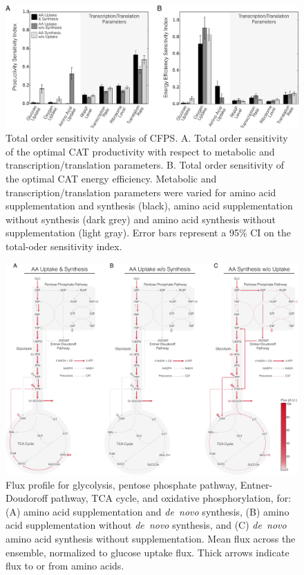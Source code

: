 \documentclass[journal=asbcd6,manuscript=article]{achemso}
\begin{document}
\clearpage

\begin{figure}[t!]
\includegraphics[width=1.00\textwidth]{./figs/Fig-3-Sensitivity-Analysis.pdf}
\caption{Total order sensitivity analysis of CFPS.
A. Total order sensitivity of the optimal CAT productivity with respect to metabolic and transcription/translation parameters.
B. Total order sensitivity of the optimal CAT energy efficiency.
Metabolic and transcription/translation parameters were varied for amino acid supplementation and synthesis (black),
amino acid supplementation without synthesis (dark grey) and amino acid synthesis without supplementation (light gray).
Error bars represent a 95\% CI on the total-oder sensitivity index.}
\label{fig:SI}
\end{figure}

\clearpage

\begin{figure}[t!]
\includegraphics[width=1.00\textwidth]{./figs/Fig-5-FluxDistribition-Optimal.pdf}
\caption{Flux profile for glycolysis, pentose phosphate pathway, Entner-Doudoroff pathway,
TCA cycle, and oxidative phosphorylation, for: (A) amino acid supplementation and \textit{de~novo} synthesis,
(B) amino acid supplementation without \textit{de~novo} synthesis, and
(C) \textit{de~novo} amino acid synthesis without supplementation.
Mean flux across the ensemble, normalized to glucose uptake flux. Thick arrows indicate flux to or from amino acids.}
\label{fig:flux}
\end{figure}
\end{document}
